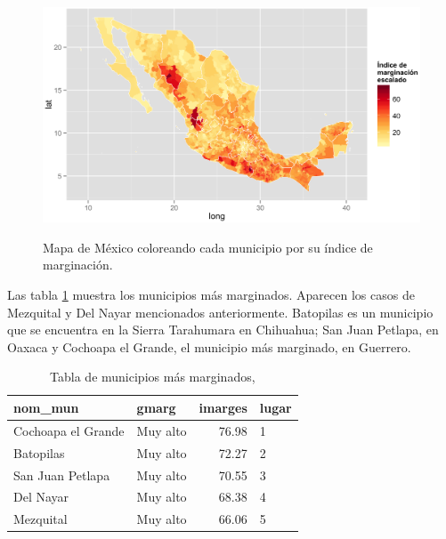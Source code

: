 \begin{landscape}
\begin{figure}[!ht]
\centering
\includegraphics[width=1.4\textheight]{./maps/mapmarg.png} \\
\caption{Mapa de México coloreando cada municipio por su índice de marginación.}
\label{obj:mapmarg}  
\end{figure}
\end{landscape}

Las tabla \ref{tab:masmarg}  muestra los municipios más marginados. Aparecen los casos de Mezquital y Del Nayar mencionados anteriormente. Batopilas es un municipio que se encuentra en la Sierra Tarahumara en Chihuahua; San Juan Petlapa, en Oaxaca y  Cochoapa el Grande, el municipio más marginado, en Guerrero.

\begin{table}[ht]
\centering
\begin{tabular}{llrl}
  \hline
nom\_mun & gmarg & imarges & lugar \\ 
  \hline
  Cochoapa el Grande & Muy alto & 76.98 & 1 \\
  Batopilas & Muy alto & 72.27 & 2 \\ 
  San Juan Petlapa & Muy alto & 70.55 & 3 \\ 
  Del Nayar & Muy alto & 68.38 & 4 \\
  Mezquital & Muy alto & 66.06 & 5 \\ 
   \hline
\end{tabular}
\caption[Municipios más marginados]
            {Tabla de municipios más marginados,}
\label{tab:masmarg}
\end{table}



